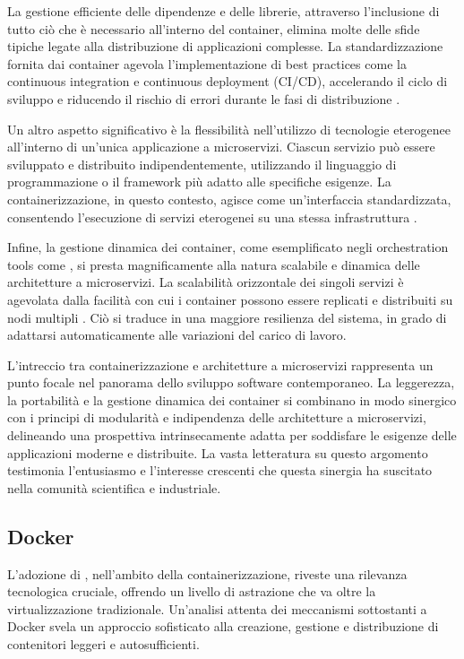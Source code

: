 La gestione efficiente delle dipendenze e delle librerie, attraverso l'inclusione di tutto ciò che è necessario all'interno del container, elimina molte delle sfide tipiche legate alla distribuzione di applicazioni complesse. La standardizzazione fornita dai container agevola l'implementazione di best practices come la continuous integration e continuous deployment (CI/CD), accelerando il ciclo di sviluppo e riducendo il rischio di errori durante le fasi di distribuzione \cite{fowler2013continuous}.

Un altro aspetto significativo è la flessibilità nell'utilizzo di tecnologie eterogenee all'interno di un'unica applicazione a microservizi. Ciascun servizio può essere sviluppato e distribuito indipendentemente, utilizzando il linguaggio di programmazione o il framework più adatto alle specifiche esigenze. La containerizzazione, in questo contesto, agisce come un'interfaccia standardizzata, consentendo l'esecuzione di servizi eterogenei su una stessa infrastruttura \cite{burns2016borg}.

Infine, la gestione dinamica dei container, come esemplificato negli orchestration tools come , si presta magnificamente alla natura scalabile e dinamica delle architetture a microservizi. La scalabilità orizzontale dei singoli servizi è agevolata dalla facilità con cui i container possono essere replicati e distribuiti su nodi multipli \cite{burns2016borg}. Ciò si traduce in una maggiore resilienza del sistema, in grado di adattarsi automaticamente alle variazioni del carico di lavoro.

L'intreccio tra containerizzazione e architetture a microservizi rappresenta un punto focale nel panorama dello sviluppo software contemporaneo. La leggerezza, la portabilità e la gestione dinamica dei container si combinano in modo sinergico con i principi di modularità e indipendenza delle architetture a microservizi, delineando una prospettiva intrinsecamente adatta per soddisfare le esigenze delle applicazioni moderne e distribuite. La vasta letteratura su questo argomento testimonia l'entusiasmo e l'interesse crescenti che questa sinergia ha suscitato nella comunità scientifica e industriale.

\subsection{Docker}

L'adozione di , nell'ambito della containerizzazione, riveste una rilevanza tecnologica cruciale, offrendo un livello di astrazione che va oltre la virtualizzazione tradizionale. Un'analisi attenta dei meccanismi sottostanti a Docker svela un approccio sofisticato alla creazione, gestione e distribuzione di contenitori leggeri e autosufficienti.

